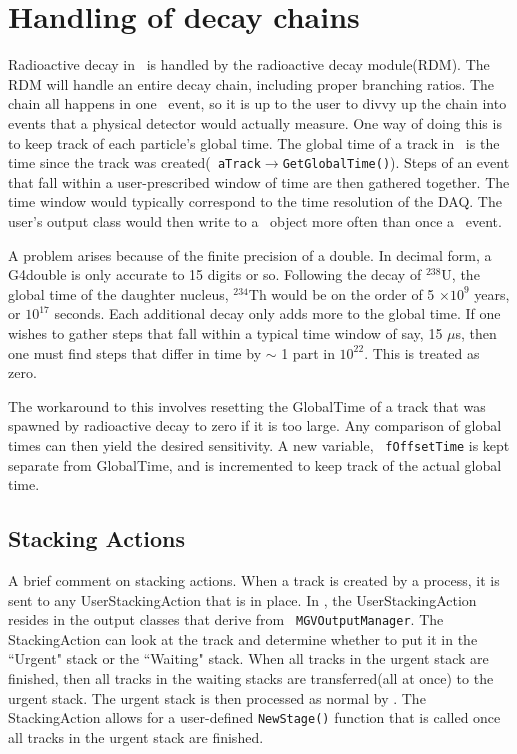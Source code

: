 \section{Handling of decay chains} 

Radioactive decay in \geant \ is handled by the radioactive decay module(RDM).
The RDM will handle an entire decay chain, including proper branching ratios.
The chain all happens in one \geant \ event, so it is up to the user to divvy up
the chain into events that a physical detector would actually measure.  One way
of doing this is to keep track of each particle's global time.  The global time
of a track in \geant \ is the time since the track was created({\tt
aTrack$\rightarrow$GetGlobalTime()}).   Steps of an event that fall within a
user-prescribed window of time are then gathered together.  The time window
would typically correspond to the time resolution of the DAQ.  The user's output
class would then write to a \rootv \ object more often than once a \geant \ event.  

A problem arises because of the finite precision of a double.  In decimal form,
a G4double is only accurate to 15 digits or so.  Following the decay of
$^{238}$U, the global time of the daughter nucleus, $^{234}$Th would be on the
order of 5 $\times 10^9$ years, or $10^{17}$ seconds.  Each additional decay
only adds more to the global time.  If one wishes to gather steps that fall
within a typical time window of say, 15 $\mu$s, then one must find steps that
differ in time by $\sim$ 1 part in $10^{22}$.  This is treated as zero.

The workaround to this involves resetting the GlobalTime of a track that was
spawned by radioactive decay to zero if it is too large.  Any comparison of
global times can then yield the desired sensitivity.  A new variable, {\tt
fOffsetTime} is kept separate from GlobalTime, and is incremented to keep track
of the actual global time.

\subsection{Stacking Actions}

A brief comment on stacking actions.  When a track is created by a process, it
is sent to any UserStackingAction that is in place.  In \mage, the
UserStackingAction resides in the output classes that derive from {\tt
MGVOutputManager}.  The StackingAction can look at the track and determine
whether to put it in the ``Urgent" stack or the ``Waiting" stack.  When all
tracks in the urgent stack are finished, then all tracks in the waiting stacks
are transferred(all at once) to the urgent stack.  The urgent stack is then
processed as normal by \geant.  The StackingAction allows for a user-defined
{\tt NewStage()} function that is called once all tracks in the urgent stack are
finished.

